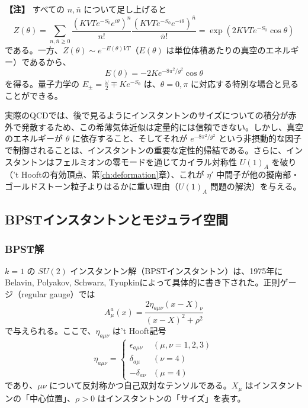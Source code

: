 \documentclass[uplatex, dvipdfmx, book]{jsbook}
\let\origsubsection\subsection
\let\origsubsubsection\subsubsection
\renewcommand{\section}{\origsubsection}
\renewcommand{\subsection}{\origsubsubsection}
\renewcommand{\subsubsection}{\paragraph}
\newenvironment{note}{\vspace{1ex}\par\footnotesize\noindent\textbf{【注】}}{\par\vspace{1ex}}
\begin{document}
\begin{note}
すべての $n, \bar{n}$ について足し上げると
\begin{equation*}
    Z(\theta) = \sum_{n, \bar{n} \ge 0} \frac{(KVTe^{-S_0}e^{i\theta})^n}{n!}\frac{(KVTe^{-S_0}e^{-i\theta})^{\bar{n}}}{\bar{n}!} = \exp\left( 2KVTe^{-S_0}\cos\theta \right)
\end{equation*}
である。一方、$Z(\theta) \sim e^{-E(\theta)VT}$（$E(\theta)$ は単位体積あたりの真空のエネルギー）であるから、
\begin{equation*}
    E(\theta) = -2Ke^{-8\pi^2/g^2}\cos\theta
\end{equation*}
を得る。量子力学の $E_\pm = \frac{\omega}{2} \mp Ke^{-S_0}$ は、$\theta = 0, \pi$ に対応する特別な場合と見ることができる。
\end{note}

実際のQCDでは、後で見るようにインスタントンのサイズについての積分が赤外で発散するため、この希薄気体近似は定量的には信頼できない。しかし、真空のエネルギーが $\theta$ に依存すること、そしてそれが $e^{-8\pi^2/g^2}$ という非摂動的な因子で制御されることは、インスタントンの重要な定性的帰結である。さらに、インスタントンはフェルミオンの零モードを通じてカイラル対称性 $U(1)_A$ を破り（'t Hooftの有効頂点、第\ref{ch:deformation}章）、これが $\eta'$ 中間子が他の擬南部・ゴールドストーン粒子よりはるかに重い理由（$U(1)_A$ 問題の解決）を与える\cite{thooft1976}。

\section{BPSTインスタントンとモジュライ空間}
\label{sec:bpst}

\subsection{BPST解}

$k=1$ の $SU(2)$ インスタントン解（BPSTインスタントン）は、1975年にBelavin, Polyakov, Schwarz, Tyupkinによって具体的に書き下された\cite{bpst1975}。正則ゲージ（regular gauge）では
\begin{equation}
    A_\mu^a(x) = \frac{2 \eta_{a\mu\nu} (x - X)_\nu}{(x - X)^2 + \rho^2}
    \label{eq:BPST}
\end{equation}
で与えられる。ここで、$\eta_{a\mu\nu}$ は't Hooft記号
\begin{equation}
    \eta_{a\mu\nu} = \begin{cases} \epsilon_{a\mu\nu} & (\mu, \nu = 1, 2, 3) \\ \delta_{a\mu} & (\nu = 4) \\ -\delta_{a\nu} & (\mu = 4) \end{cases}
\end{equation}
であり、$\mu\nu$ について反対称かつ自己双対なテンソルである。$X_\mu$ はインスタントンの「中心位置」、$\rho > 0$ はインスタントンの「サイズ」を表す。
\end{document}
